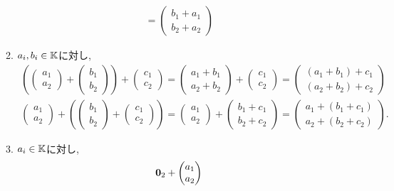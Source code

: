 \begin{example}
\begin{enumerate}
\begin{enumerate}
\begin{align*}
=\begin{pmatrix}b_1+a_1\\b_2+a_2\end{pmatrix}
\end{align*}
    \item  $a_i,b_i\in\mathbb{K}$に対し,
    \begin{align*}
(\begin{pmatrix}a_1\\a_2\end{pmatrix}+\begin{pmatrix}b_1\\b_2\end{pmatrix})
+\begin{pmatrix}c_1\\c_2\end{pmatrix}
=\begin{pmatrix}a_1+b_1\\a_2+b_2\end{pmatrix}
+\begin{pmatrix}c_1\\c_2\end{pmatrix}
=\begin{pmatrix}(a_1+b_1)+c_1\\(a_2+b_2)+c_2\end{pmatrix}\\
\begin{pmatrix}a_1\\a_2\end{pmatrix}+
(\begin{pmatrix}b_1\\b_2\end{pmatrix}
+\begin{pmatrix}c_1\\c_2\end{pmatrix})
=\begin{pmatrix}a_1\\a_2\end{pmatrix}
+\begin{pmatrix}b_1+c_1\\b_2+c_2\end{pmatrix}
=\begin{pmatrix}a_1+(b_1+c_1)\\a_2+(b_2+c_2)\end{pmatrix}.
\end{align*}
    \item $a_i\in\mathbb{K}$に対し,
    \begin{align*}
    \zzero_2+\begin{pmatrix}a_1\\a_2\end{pmatrix}

\end{align*}
\end{enumerate}
\end{enumerate}
\end{example}
